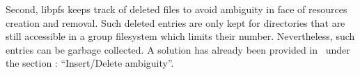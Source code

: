 Second, libpfs keeps track of deleted files to avoid ambiguity
in face of resources creation and removal. Such deleted entries are
only kept for directories that are still accessible in a group
filesystem which limits their number. Nevertheless, such entries can
be garbage collected. A solution has already been provided
in~\cite{page:ficus} under the section : ``Insert/Delete ambiguity''.

\endinput


